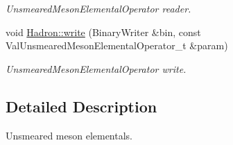 \begin{DoxyCompactItemize}
\begin{DoxyCompactList}\small\item\em Unsmeared\+Meson\+Elemental\+Operator reader. \end{DoxyCompactList}\item 
void \mbox{\hyperlink{namespaceHadron_a78737ee2e9f7f708d926ec9f531c8f61}{Hadron\+::write}} (Binary\+Writer \&bin, const Val\+Unsmeared\+Meson\+Elemental\+Operator\+\_\+t \&param)
\begin{DoxyCompactList}\small\item\em Unsmeared\+Meson\+Elemental\+Operator write. \end{DoxyCompactList}\end{DoxyCompactItemize}


\subsection{Detailed Description}
Unsmeared meson elementals. 

